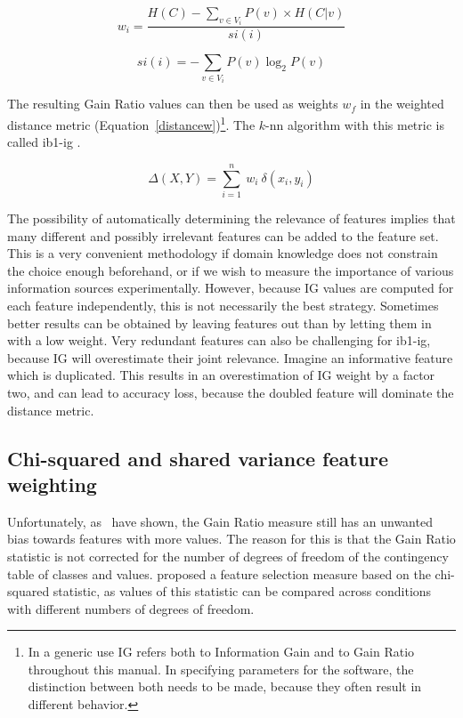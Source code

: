 \documentclass{report}
\begin{document}
\begin{equation}
w_{i} = \frac{H(C) -  \sum_{v \in V_{i}} P(v) \times H(C|v)}{si(i)}
\label{IGgainratio}
\end{equation}

\begin{equation}
si(i) = - \sum_{v \in V_{i}} P(v) \log_{2} P(v)
\label{splitinfo}
\end{equation}

The resulting Gain Ratio values can then be used as weights $w_{f}$ in
the weighted distance metric (Equation~\ref{distancew})\footnote{In a
generic use IG refers both to Information Gain and to Gain Ratio
throughout this manual. In specifying parameters for the software, the
distinction between both needs to be made, because they often result
in different behavior.}. The $k$-{\sc nn} algorithm with this
metric is called {\sc ib1-ig} \cite{Daelemans+92b}.

\begin{equation}
\Delta(X,Y) = \sum_{i=1}^{n}\ w_{i} \ \delta(x_{i},y_{i})
\label{distancew}
\end{equation} 

The possibility of automatically determining the relevance of features
implies that many different and possibly irrelevant features can be
added to the feature set. This is a very convenient methodology if
domain knowledge does not constrain the choice enough beforehand, or
if we wish to measure the importance of various information sources
experimentally. However, because IG values are computed for each
feature independently, this is not necessarily the best
strategy. Sometimes better results can be obtained by leaving features
out than by letting them in with a low weight. Very redundant features
can also be challenging for {\sc ib1-ig}, because IG will overestimate
their joint relevance. Imagine an informative feature which is
duplicated. This results in an overestimation of IG weight by a factor
two, and can lead to accuracy loss, because the doubled feature will
dominate the distance metric.

\subsection{Chi-squared and shared variance feature weighting}
\label{chisquared}

Unfortunately, as~ have shown, the Gain Ratio measure
still has an unwanted bias towards features with more values. The
reason for this is that the Gain Ratio statistic is not corrected for
the number of degrees of freedom of the contingency table of classes
and values.  proposed a feature selection measure based
on the chi-squared statistic, as values of this statistic can be
compared across conditions with different numbers of degrees of
freedom.
\end{document}
